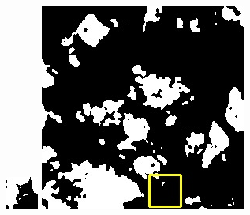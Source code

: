 \documentclass[10pt]{ctexart}
\begin{document}
\begin{figure}[H]
{{\begin{minipage}[b]{0.15\linewidth}
            \includegraphics[width=1\linewidth]{../log/spoon2/cut/tmp_cut_LC80350192014190LGN00_06561_unet.jpg}\vspace{4pt}
            \includegraphics[width=1\linewidth]{../log/spoon2/cut/LC80980712014024LGN00_15443_unet.jpg}\vspace{4pt}

\end{minipage}}}
\end{figure}
\end{document}

